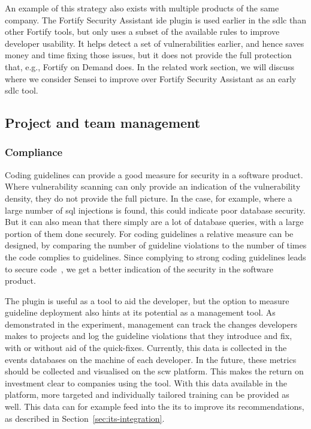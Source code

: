 An example of this strategy also exists with multiple products of the same company. 
The Fortify Security Assistant \gls{ide} plugin is used earlier in the \gls{sdlc} than other Fortify tools, but only uses a subset of the available rules to improve developer usability.
It helps detect a set of vulnerabilities earlier, and hence saves money and time fixing those issues, but it does not provide the full protection that, e.g., Fortify on Demand does.
In the related work section, we will discuss where we consider Sensei to improve over Fortify Security Assistant as an early \gls{sdlc} tool.

\subsection{Project and team management}
\subsubsection{Compliance}
Coding guidelines can provide a good measure for security in a software product.
Where vulnerability scanning can only provide an indication of the vulnerability density, they do not provide the full picture.
In the case, for example, where a large number of \gls{sql} injections is found, this could indicate poor database security.
But it can also mean that there simply are a lot of database queries, with a large portion of them done securely.
For coding guidelines a relative measure can be designed, by comparing the number of guideline violations to the number of times the code complies to guidelines. Since complying to strong coding guidelines leads to secure code~\cite{banerjee2009software,tabassum2017comparing}, we get a better indication of the security in the software product.

The plugin is useful as a tool to aid the developer, but the option to measure guideline deployment also hints at its potential as a management tool.
As demonstrated in the experiment, management can track the changes developers makes to projects and log the guideline violations that they introduce and fix, with or without aid of the quick-fixes.
Currently, this data is collected in the events databases on the machine of each developer.
In the future, these metrics should be collected and visualised on the \gls{scw} platform.
This makes the return on investment clear to companies using the tool.
With this data available in the platform, more targeted and individually tailored training can be provided as well.
This data can for example feed into the \gls{its} to improve its recommendations, as described in Section~\ref{sec:its-integration}.

